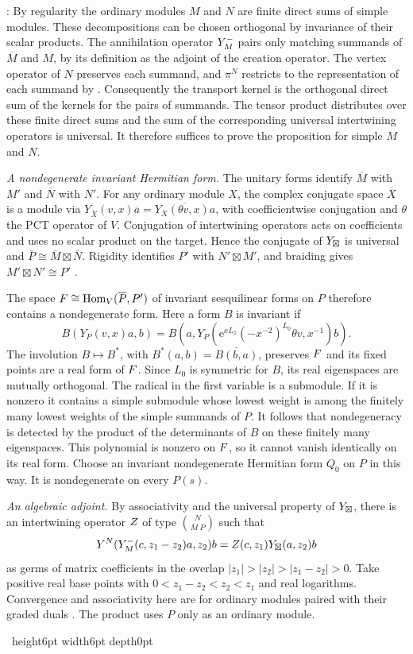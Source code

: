 \documentclass[leqno]{article}
\let\cal\relax
\newcommand{\cal}{\mathcal}
\newcommand{\qed}{\hfill \vrule height6pt  width6pt depth0pt}
\newcommand{\ovl}{\overline}
\newcommand{\e}{\mathrm{e}} %
\newenvironment{proof}[1][]{\noindent {\it Proof #1} : }{\hbox{~}\qed
\smallskip
}
\numberwithin{equation}{section}
\begin{document}
\begin{proof}
By regularity the ordinary modules $M$ and $N$ are finite direct sums of simple modules. These decompositions can be chosen orthogonal by invariance of their scalar products. The annihilation operator $\cal Y^-_M$ pairs only matching summands of $\ovl M$ and $M$, by its definition as the adjoint of the creation operator. The vertex operator of $N$ preserves each summand, and $\pi^N$ restricts to the representation of each summand by \cite[Proposition 5.5]{Ten19a}. Consequently the transport kernel is the orthogonal direct sum of the kernels for the pairs of summands. The tensor product distributes over these finite direct sums and the sum of the corresponding universal intertwining operators is universal. It therefore suffices to prove the proposition for simple $M$ and $N$.

\emph{A nondegenerate invariant Hermitian form.} The unitary forms identify $\ovl M$ with $M'$ and $\ovl N$ with $N'$. For any ordinary module $X$, the complex conjugate space $\ovl X$ is a module via $Y_{\ovl X}(v,x)\ovl a=\ovl{Y_X(\theta v,x)a}$, with coefficientwise conjugation and $\theta$ the PCT operator of $V$. Conjugation of intertwining operators \cite[(1.25)]{Gui22} acts on coefficients and uses no scalar product on the target. Hence the conjugate of $\cal Y_\boxtimes$ is universal and $\ovl P\cong\ovl M\boxtimes\ovl N$. Rigidity identifies $P'$ with $N'\boxtimes M'$, and braiding gives $M'\boxtimes N'\cong P'$ \cite{Hua08}.

The space $\cal F\cong\operatorname{Hom}_V(\ovl P,P')$ of invariant sesquilinear forms on $P$ therefore contains a nondegenerate form. Here a form $B$ is invariant if
\[
B(Y_P(v,x)a,b)=B(a,Y_P(\e^{xL_1}(-x^{-2})^{L_0}\theta v,x^{-1})b).
\]
The involution $B\mapsto B^*$, with $B^*(a,b)=\ovl{B(b,a)}$, preserves $\cal F$ and its fixed points are a real form of $\cal F$. Since $L_0$ is symmetric for $B$, its real eigenspaces are mutually orthogonal. The radical in the first variable is a submodule. If it is nonzero it contains a simple submodule whose lowest weight is among the finitely many lowest weights of the simple summands of $P$. It follows that nondegeneracy is detected by the product of the determinants of $B$ on these finitely many eigenspaces. This polynomial is nonzero on $\cal F$, so it cannot vanish identically on its real form. Choose an invariant nondegenerate Hermitian form $Q_0$ on $P$ in this way. It is nondegenerate on every $P(s)$.

\emph{An algebraic adjoint.} By associativity and the universal property of $\cal Y_\boxtimes$, there is an intertwining operator $\cal Z$ of type $\binom{N}{\ovl M\ P}$ such that
\[
Y^N(\cal Y^-_M(c,z_1-z_2)a,z_2)b
  =\cal Z(c,z_1)\cal Y_\boxtimes(a,z_2)b
\]
as germs of matrix coefficients in the overlap $|z_1|>|z_2|>|z_1-z_2|>0$. Take positive real base points with $0<z_1-z_2<z_2<z_1$ and real logarithms. Convergence and associativity here are for ordinary modules paired with their graded duals \cite{Hua05}. The product uses $P$ only as an ordinary module.


\end{proof}
\end{document}
